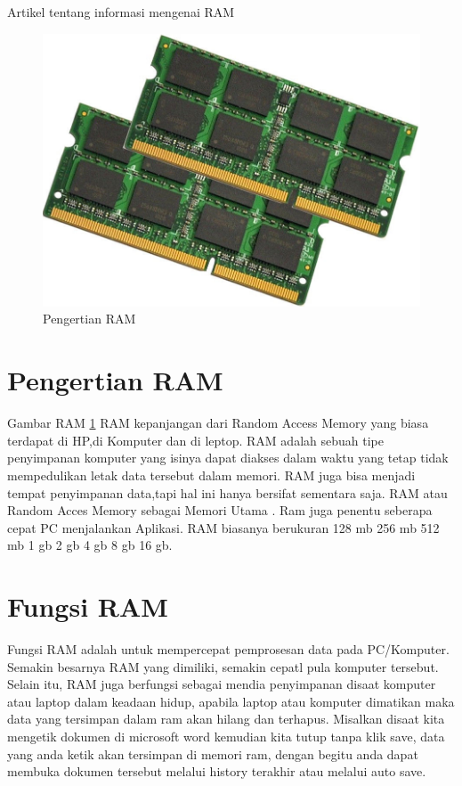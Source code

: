 ﻿%





Artikel tentang informasi mengenai RAM

  \begin{figure}[ht]
  \centerline{\includegraphics[width=1\textwidth]{figures/RAM.jpg}}
  \caption{Pengertian RAM}
  \label{RAM}
  \end{figure}

\section{Pengertian RAM}
Gambar RAM \ref{RAM}
RAM kepanjangan dari Random Access Memory yang biasa terdapat di HP,di Komputer dan di leptop.
RAM adalah sebuah tipe penyimpanan komputer yang isinya dapat diakses dalam waktu yang tetap tidak mempedulikan letak data tersebut dalam memori.
RAM juga bisa menjadi tempat penyimpanan data,tapi hal ini hanya bersifat sementara saja.
RAM atau Random Acces Memory sebagai Memori Utama . Ram juga penentu seberapa cepat PC menjalankan Aplikasi.
RAM biasanya berukuran 128 mb 256 mb 512 mb 1 gb 2 gb 4 gb 8 gb 16 gb.

\section{Fungsi RAM}
Fungsi RAM adalah untuk mempercepat pemprosesan data pada PC/Komputer. Semakin besarnya RAM yang dimiliki, semakin cepatl pula komputer tersebut.
Selain itu, RAM juga berfungsi sebagai mendia penyimpanan disaat komputer atau laptop dalam keadaan hidup, apabila laptop atau komputer dimatikan maka data yang tersimpan dalam ram akan hilang dan terhapus. Misalkan disaat kita mengetik dokumen di microsoft word kemudian kita tutup tanpa klik save, data yang anda ketik akan tersimpan di memori ram, dengan begitu anda dapat membuka dokumen tersebut melalui history terakhir atau melalui auto save.

